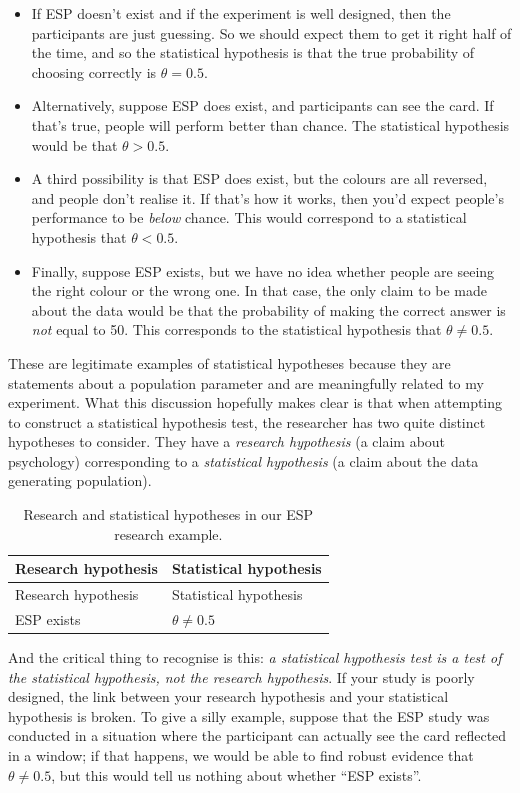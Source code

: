 \documentclass[
]{book}
\providecommand{\tightlist}{%
  \setlength{\itemsep}{0pt}\setlength{\parskip}{0pt}}
\theoremstyle{definition}
\theoremstyle{definition}
\theoremstyle{definition}
\theoremstyle{definition}
\theoremstyle{remark}
\begin{document}
\begin{itemize}
\tightlist
\item
  If ESP doesn't exist and if the experiment is well designed, then the participants are just guessing. So we should expect them to get it right half of the time, and so the statistical hypothesis is that the true probability of choosing correctly is \(\theta = 0.5\).
\item
  Alternatively, suppose ESP does exist, and participants can see the card. If that's true, people will perform better than chance. The statistical hypothesis would be that \(\theta > 0.5\).
\item
  A third possibility is that ESP does exist, but the colours are all reversed, and people don't realise it. If that's how it works, then you'd expect people's performance to be \emph{below} chance. This would correspond to a statistical hypothesis that \(\theta < 0.5\).
\item
  Finally, suppose ESP exists, but we have no idea whether people are seeing the right colour or the wrong one. In that case, the only claim to be made about the data would be that the probability of making the correct answer is \emph{not} equal to 50. This corresponds to the statistical hypothesis that \(\theta \neq 0.5\).
\end{itemize}

These are legitimate examples of statistical hypotheses because they are statements about a population parameter and are meaningfully related to my experiment. What this discussion hopefully makes clear is that when attempting to construct a statistical hypothesis test, the researcher has two quite distinct hypotheses to consider. They have a \emph{research hypothesis} (a claim about psychology) corresponding to a \emph{statistical hypothesis} (a claim about the data generating population).

\begin{longtable}[]{@{}ll@{}}
\caption{\label{tab:unnamed-chunk-29}Research and statistical hypotheses in our ESP research example.}\tabularnewline
\toprule()
Research hypothesis & Statistical hypothesis \\
\midrule()
\endfirsthead
\toprule()
Research hypothesis & Statistical hypothesis \\
\midrule()
\endhead
ESP exists & \(\theta \neq 0.5\) \\
\bottomrule()
\end{longtable}

And the critical thing to recognise is this: \emph{a statistical hypothesis test is a test of the statistical hypothesis, not the research hypothesis}. If your study is poorly designed, the link between your research hypothesis and your statistical hypothesis is broken. To give a silly example, suppose that the ESP study was conducted in a situation where the participant can actually see the card reflected in a window; if that happens, we would be able to find robust evidence that \(\theta \neq 0.5\), but this would tell us nothing about whether ``ESP exists''.
\end{document}
